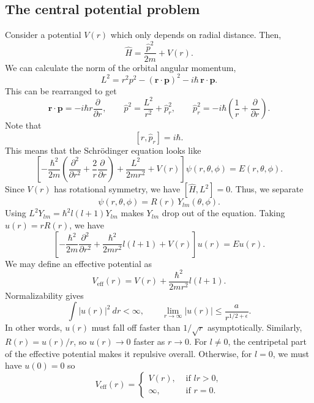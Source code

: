 \documentclass[11pt]{article}
\newcommand\ve[1]{\boldsymbol{#1}}
\newcommand\pp[3][]{\frac{\partial^{#1}{#2}}{\partial {#3}^{#1}}}
\def\vr{\ve{r}}
\def\vp{\ve{p}}
\theoremstyle{definition}
\theoremstyle{remark}
\numberwithin{equation}{section}
\begin{document}
    \subsection{The central potential problem}
    Consider a potential $V(r)$ which only depends on radial distance.
    Then, \[
        \hat{H} = \frac{\hat{p}^2}{2m} + V(r).
    \] We can calculate the norm of the orbital angular momentum, \[
        L^2 = r^2p^2 - (\vr \cdot \vp)^2 - i\hbar\,\vr\cdot\vp.
    \] This can be rearranged to get \[
        \vr\cdot\vp = -i\hbar r\pp{}{r}, \qquad 
        \hat{p}^2 = \frac{L^2}{r^2} + \hat{p}_r^2, \qquad
        \hat{p}_r^2 = -i\hbar \left(\frac{1}{r} + \pp{}{r}\right).
    \] Note that \[
        [r, \hat{p}_r] = i\hbar.
    \] This means that the Schr\"odinger equation looks like \[
        \left[-\frac{\hbar^2}{2m}\left(\pp[2]{}{r} + \frac{2}{r}\pp{}{r}\right) +
        \frac{L^2}{2mr^2} + V(r)\right]\psi(r, \theta, \phi) = E(r, \theta, \phi).
    \] Since $V(r)$ has rotational symmetry, we have $[\hat{H}, L^2] = 0$. Thus, we
    separate \[
        \psi(r, \theta, \phi) = R(r)\,Y_{lm}(\theta, \phi).
    \] Using $L^2Y_{lm} = \hbar^2l(l+1)Y_{lm}$ makes $Y_{lm}$ drop out of the
    equation. Taking $u(r) = rR(r)$, we have \[
        \left[-\frac{\hbar^2}{2m}\pp[2]{}{r} + \frac{\hbar^2}{2mr^2}l(l + 1) +
        V(r)\right]u(r) = Eu(r).
    \] We may define an effective potential as \[
        V_\text{eff}(r) = V(r) + \frac{\hbar^2}{2mr^2}l(l+1).
    \] Normalizability gives \[
        \int |u(r)|^2 \:dr < \infty, \qquad
        \lim_{r \to \infty} |u(r)| \leq \frac{a}{r^{1 /2 + \epsilon}}.
    \] In other words, $u(r)$ must fall off faster than $1 / \sqrt{r}$
    asymptotically. Similarly, $R(r) = u(r) / r$, so $u(r) \to 0$ faster as $r
    \to 0$. For $l \neq 0$, the centripetal part of the effective potential makes it
    repulsive overall. Otherwise, for $l = 0$, we must have $u(0) = 0$ so \[
        V_\text{eff}(r) = \begin{cases}
            V(r), &\text{ if }l r > 0, \\
            \infty, &\text{ if } r = 0.
        \end{cases}
    \] 
    
\end{document}
